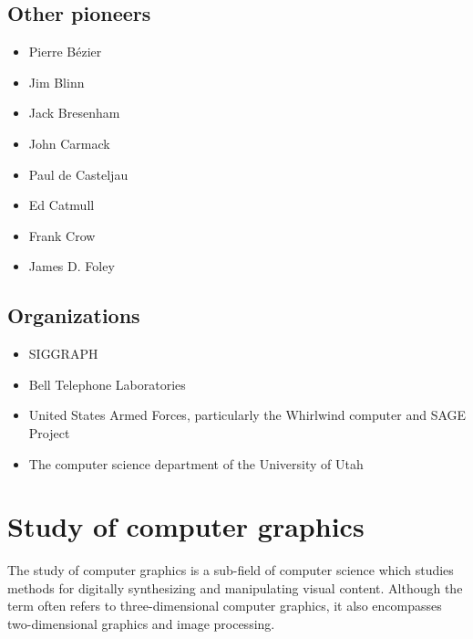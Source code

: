 \documentclass[a4paper]{article}
\begin{document}
  \subsection{Other pioneers}
  \begin{itemize}
  \item Pierre Bézier
  \item Jim Blinn
   \item Jack Bresenham
    \item John Carmack
    \item Paul de Casteljau
    \item Ed Catmull
    \item Frank Crow
    \item James D. Foley
  \end{itemize}
  \subsection{Organizations}
  \begin{itemize}
  \item SIGGRAPH
   \item Bell Telephone Laboratories
    \item United States Armed Forces, particularly the Whirlwind computer and SAGE Project
     \item The computer science department of the University of Utah
     
  \end{itemize}
  
  
  \newpage
  \section{Study of computer graphics}
  The study of computer graphics is a sub-field of computer science which studies methods for digitally synthesizing and manipulating visual content. Although the term often refers to three-dimensional computer graphics, it also encompasses two-dimensional graphics and image processing.
\end{document}
